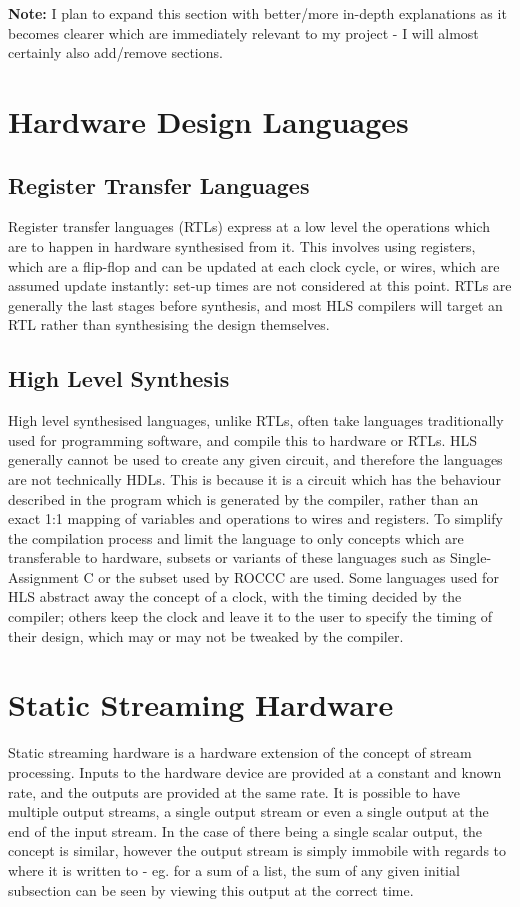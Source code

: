 
\noindent
\textbf{Note:} I plan to expand this section with better/more in-depth explanations as it becomes clearer which are immediately relevant to my project - I will almost certainly also add/remove sections.
\section{Hardware Design Languages}
\subsection{Register Transfer Languages}
Register transfer languages (RTLs) express at a low level the operations which are to happen in hardware synthesised from it. This involves using registers, which are a flip-flop and can be updated at each clock cycle, or wires, which are assumed update instantly: set-up times are not considered at this point. RTLs are generally the last stages before synthesis, and most HLS compilers will target an RTL rather than synthesising the design themselves.

\subsection{High Level Synthesis}
High level synthesised languages, unlike RTLs, often take languages traditionally used for programming software, and compile this to hardware or RTLs. HLS generally cannot be used to create any given circuit, and therefore the languages are not technically HDLs. This is because it is a circuit which has the behaviour described in the program which is generated by the compiler, rather than an exact 1:1 mapping of variables and operations to wires and registers. To simplify the compilation process and limit the language to only concepts which are transferable to hardware, subsets or variants of these languages such as Single-Assignment C \cite{sa-c} or the subset used by ROCCC \cite{5474060} are used. Some languages used for HLS abstract away the concept of a clock, with the timing decided by the compiler; others keep the clock and leave it to the user to specify the timing of their design, which may or may not be tweaked by the compiler.

\section{Static Streaming Hardware}
Static streaming hardware is a hardware extension of the concept of stream processing. Inputs to the hardware device are provided at a constant and known rate, and the outputs are provided at the same rate. It is possible to have multiple output streams, a single output stream or even a single output at the end of the input stream. In the case of there being a single scalar output, the concept is similar, however the output stream is simply immobile with regards to where it is written to - eg. for a sum of a list, the sum of any given initial subsection can be seen by viewing this output at the correct time.

